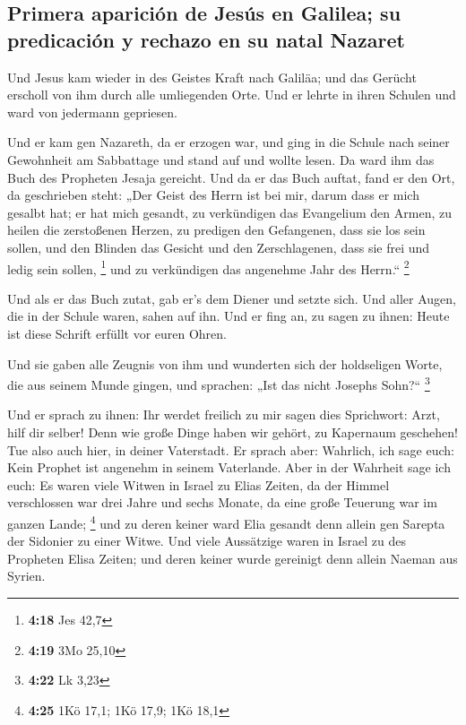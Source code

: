 \hypertarget{primera-apariciuxf3n-de-jesuxfas-en-galilea-su-predicaciuxf3n-y-rechazo-en-su-natal-nazaret}{%
\subsection{Primera aparición de Jesús en Galilea; su predicación y
rechazo en su natal
Nazaret}\label{primera-apariciuxf3n-de-jesuxfas-en-galilea-su-predicaciuxf3n-y-rechazo-en-su-natal-nazaret}}

 Und Jesus kam wieder in des Geistes Kraft nach Galiläa;
und das Gerücht erscholl von ihm durch alle umliegenden Orte.
 Und er lehrte in ihren Schulen und ward von jedermann
gepriesen.

 Und er kam gen Nazareth, da er erzogen war, und ging in
die Schule nach seiner Gewohnheit am Sabbattage und stand auf und wollte
lesen.  Da ward ihm das Buch des Propheten Jesaja
gereicht. Und da er das Buch auftat, fand er den Ort, da geschrieben
steht:  „Der Geist des Herrn ist bei mir, darum dass er
mich gesalbt hat; er hat mich gesandt, zu verkündigen das Evangelium den
Armen, zu heilen die zerstoßenen Herzen, zu predigen den Gefangenen,
dass sie los sein sollen, und den Blinden das Gesicht und den
Zerschlagenen, dass sie frei und ledig sein sollen, \footnote{\textbf{4:18}
  Jes 42,7}  und zu verkündigen das angenehme Jahr des
Herrn.`` \footnote{\textbf{4:19} 3Mo 25,10}

 Und als er das Buch zutat, gab er's dem Diener und
setzte sich. Und aller Augen, die in der Schule waren, sahen auf ihn.
 Und er fing an, zu sagen zu ihnen: Heute ist diese
Schrift erfüllt vor euren Ohren.

 Und sie gaben alle Zeugnis von ihm und wunderten sich
der holdseligen Worte, die aus seinem Munde gingen, und sprachen: „Ist
das nicht Josephs Sohn?{}`` \footnote{\textbf{4:22} Lk 3,23}

 Und er sprach zu ihnen: Ihr werdet freilich zu mir sagen
dies Sprichwort: Arzt, hilf dir selber! Denn wie große Dinge haben wir
gehört, zu Kapernaum geschehen! Tue also auch hier, in deiner
Vaterstadt.  Er sprach aber: Wahrlich, ich sage euch:
Kein Prophet ist angenehm in seinem Vaterlande.  Aber in
der Wahrheit sage ich euch: Es waren viele Witwen in Israel zu Elias
Zeiten, da der Himmel verschlossen war drei Jahre und sechs Monate, da
eine große Teuerung war im ganzen Lande; \footnote{\textbf{4:25} 1Kö
  17,1; 1Kö 17,9; 1Kö 18,1}  und zu deren keiner ward
Elia gesandt denn allein gen Sarepta der Sidonier zu einer Witwe.
 Und viele Aussätzige waren in Israel zu des Propheten
Elisa Zeiten; und deren keiner wurde gereinigt denn allein Naeman aus
Syrien.

